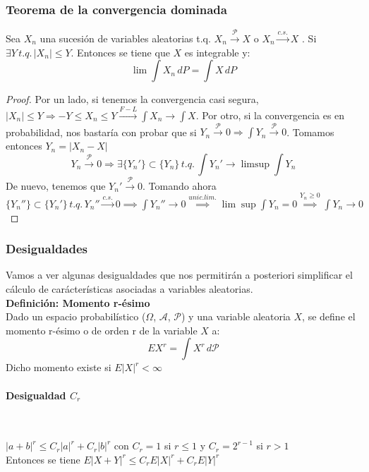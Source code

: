 \subsubsection{Teorema de la convergencia dominada}
\begin{theorem}
Sea $X_n$ una sucesión de variables aleatorias t.q.  $X_n \stackrel{\mathcal{P}}{\rightarrow} X$ o $X_n \stackrel{c.s.}{\rightarrow} X$  . Si $\exists Y \, t.q. \, |X_n |\leq Y$. Entonces se tiene que $X$ es integrable y:
$$\lim\int X_n\, dP=\int X\, dP$$
\end{theorem}

\begin{proof}
Por un lado, si tenemos la convergencia casi segura, $|X_n| \leq Y \Rightarrow -Y \leq X_n \leq Y \stackrel{F-L}{\rightarrow} \displaystyle \int X_n \to \int X$.
Por otro, si la convergencia es en probabilidad, nos bastaría con probar que si $Y_n \stackrel{\mathcal{P}}{\rightarrow} 0 \Rightarrow \displaystyle \int Y_n \stackrel{\mathcal{P}}{\rightarrow} 0$. Tomamos entonces $Y_n = |X_n - X|$
$$ Y_n \stackrel{\mathcal{P}}{\rightarrow} 0 \Rightarrow \exists \{Y_n'\} \subset \{Y_n\} \, t.q. \, \int Y_n' \rightarrow \limsup \int Y_n$$
De nuevo, tenemos que $Y_n' \stackrel{\mathcal{P}}{\rightarrow} 0$. Tomando ahora $\{Y_n''\} \subset \{Y_n'\} \, t.q. \, Y_n'' \stackrel{c.s.}{\rightarrow} 0 
\implies 
\displaystyle \int Y_n'' \rightarrow 0 \stackrel{unic.lim.}{\implies} \lim \sup \int Y_n = 0 \stackrel{Y_n \geq 0}{\implies} \int Y_n \rightarrow 0$


\end{proof}

\subsubsection{Desigualdades}

Vamos a ver algunas desigualdades que nos permitirán a posteriori simplificar el cálculo de carácterísticas asociadas a variables aleatorias.\\

\textbf{Definición: Momento r-ésimo}\\

Dado un espacio probabilístico ($\Omega$, $\mathcal{A}$, $\mathcal{P}$) y una variable aleatoria $X$, se define el momento r-ésimo o de orden r de la variable $X$ a:
$$ EX^r = \int X^r \, d \mathcal{P} $$
Dicho momento existe si $E|X|^r < \infty$

\paragraph{Desigualdad $C_r$}
\begin{lemma}

\
  
$|a+b|^r\leq C_r |a|^r + C_r |b|^r$ con $C_r=1$ si $r\leq1$ y $C_r=2^{r-1}$ si $r>1$\\

Entonces se tiene $E|X+Y|^r \leq C_r E|X|^r + C_r E|Y|^r$
\end{lemma}

